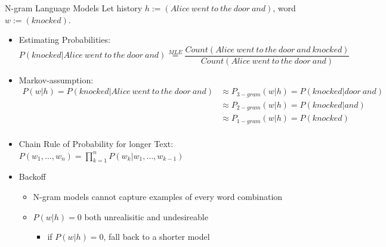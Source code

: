 \documentclass[16:9,en,navbarinfooter]{sdqbeamer}
\begin{document}
\begin{frame}{N-gram Language Models}
\vspace{1.1cm}
    Let history $h:= (Alice\ went\ to\ the\ door\ and)$, word $w:=(knocked)$.
\begin{itemize}
\item Estimating Probabilities:
    $$P(knocked|Alice\ went\ to\ the\ door\ and) \overset {MLE} = \frac {Count(Alice\ went\ to\ the\ door\ and\ knocked)}{
Count(Alice\ went\ to\ the\ door\ and)}$$

\item Markov-assumption:
\begin{equation*} 
\begin{split}
    P(w|h) = P(knocked|Alice\ went\ to\ the\ door\ and )
    & \approx P_{3-gram}(w|h) =  P(knocked|              door\ and) \\
&  \approx P_{2-gram}(w|h) =  P(knocked|                    and) \\
&  \approx P_{1-gram}(w|h) =  P(knocked) \\
\end{split}
\end{equation*}

\item Chain Rule of Probability for longer Text: $P(w_1,\ldots, w_n)=\prod_{k=1}^n P(w_k|w_1, \ldots, w_{k-1})$
\item Backoff
    \begin{itemize}
            \item N-gram models cannot capture examples of every word combination
            \item $P(w|h)=0$ both unrealisitic and undesireable
                \begin{itemize}
                    \item if $P(w|h) = 0$, fall back to a shorter model
                \end{itemize}
    \end{itemize}
\end{itemize}
\end{frame}
\end{document}

